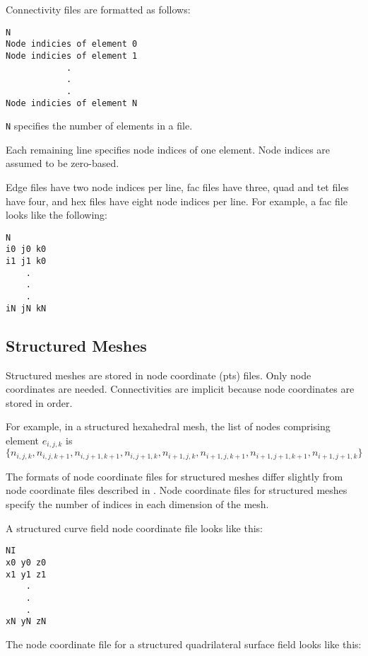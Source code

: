 Connectivity files are formatted as follows:

\begin{verbatim}
N
Node indicies of element 0
Node indicies of element 1
            .
            .
            .
Node indicies of element N
\end{verbatim}

\verb|N| specifies the number of elements in a file.

Each  remaining line specifies node indices of one element.
Node indices are assumed to be zero-based.

Edge files have two node indices per line, fac files have three, quad
and tet files have four, and hex files have eight node indices per
line.  For example, a fac file looks like the following:

\begin{verbatim}
N
i0 j0 k0
i1 j1 k0
    .
    .
    .
iN jN kN
\end{verbatim}


\subsection{Structured Meshes}
\label{sec:struct_meshes}

Structured meshes are stored in node coordinate (pts) files.  Only
node coordinates are needed.  Connectivities are implicit because node
coordinates are stored in  order.

For example, in a structured hexahedral mesh, the list of nodes comprising
element \(e_{i,j,k}\) is \(\{n_{i,j,k}, n_{i,j,k+1}, n_{i,j+1,k+1}, n_{i,j+1,k}, n_{i+1,j,k}, n_{i+1,j,k+1}, n_{i+1,j+1,k+1}, n_{i+1,j+1,k}\}\)

The formats of node coordinate files for structured meshes differ
slightly from node coordinate files described in .  Node coordinate files
for structured meshes specify the number of indices in each dimension
of the mesh.

A structured curve field node coordinate file looks like this:

\begin{verbatim}
NI
x0 y0 z0
x1 y1 z1
    .
    .
    .
xN yN zN
\end{verbatim}

The node coordinate file for a structured quadrilateral surface field
looks like this:

